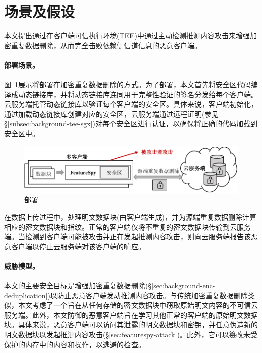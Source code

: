 \section{场景及假设}
\label{sec:featurespy-setting}

本文提出\sysnameF 通过在客户端可信执行环境(TEE)中通过主动检测推测内容攻击来增强加密重复数据删除，从而完全击败依赖侧信道信息的恶意客户端。

\paragraph*{部署场景。}图~\ref{fig:featurespy-model}展示将\sysnameF 部署在加密重复数据删除的方式。为了部署\sysnameF，本文首先将安全区代码编译成动态链接库，并将动态链接库连同用于完整性验证的签名分发给每个客户端。云服务端托管动态链接库以验证每个客户端的安全区。具体来说，客户端初始化\sysnameF，通过加载动态链接库创建对应的安全区，云服务端通过远程证明(参见\S\ref{subsec:background-tee-sgx})对每个安全区进行认证，以确保将正确的代码加载到安全区中。

\begin{figure}[!htb]
    \centering
    \includegraphics[width=\textwidth]{pic/featurespy/deployment.pdf}
    \caption{部署\sysnameF}
    \label{fig:featurespy-model}
\end{figure}

在数据上传过程中，\sysnameF 处理明文数据块(由客户端生成)，并为源端重复数据删除计算相应的密文数据块和指纹。正常的客户端仅将不重复的密文数据块传输到云服务端。当\sysnameF 检测到客户端可能被攻击并正在发起推测内容攻击，则向云服务端报告该恶意客户端以停止云服务端对该客户端的响应。

\paragraph*{威胁模型。}本文的主要安全目标是增强加密重复数据删除(\S\ref{sec:background-enc-deduplication})以防止恶意客户端发动推测内容攻击。与传统加密重复数据删除类似，本文考虑了一个旨在从任何存储的密文数据块中窃取原始明文内容的不可信云服务端。此外，本文防御的恶意客户端旨在学习其他正常的客户端的原始明文数据块。具体来说，恶意客户端可以访问其泄露的明文数据块和密钥，并任意伪造新的明文数据块以发起推测内容攻击(\S\ref{sec:featurespy-attack})。此外，它可以篡改未受保护的内存中的内容和操作，以逃避\sysnameF 的检查。


